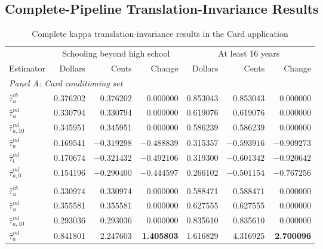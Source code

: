 \documentclass[12pt, a4paper, oneside]{article}
\theoremstyle{plain}
\theoremstyle{definition}
\begin{document}
\subsection{Complete-Pipeline Translation-Invariance Results}
\label{app:card_translation}


\begin{table}[H]
\centering
\caption{Complete kappa translation-invariance results in the Card application}
\label{tab:card_translation_kappa_appendix}
\footnotesize
\setlength{\tabcolsep}{4pt}
\begin{threeparttable}
\begin{tabular}{@{}lrrr rrr@{}}
\toprule
& \multicolumn{3}{c}{Schooling beyond high school}
& \multicolumn{3}{c}{At least 16 years} \\
\cmidrule(lr){2-4}\cmidrule(lr){5-7}
Estimator
& Dollars & Cents & Change
& Dollars & Cents & Change \\
\midrule
\multicolumn{7}{l}{\textit{Panel A: Card conditioning set}} \\[2pt]
$\hat{\tau}^{cb}_{u}$
& 0.376202 & 0.376202 & 0.000000
& 0.853043 & 0.853043 & 0.000000 \\
$\hat{\tau}^{ml}_{u}$
& 0.330794 & 0.330794 & 0.000000
& 0.619076 & 0.619076 & 0.000000 \\
$\hat{\tau}^{ml}_{a,10}$
& 0.345951 & 0.345951 & 0.000000
& 0.586239 & 0.586239 & 0.000000 \\
\addlinespace
$\hat{\tau}^{ml}_{a}$
& 0.169541 & $-0.319298$ & \textbf{$-0.488839$}
& 0.315357 & $-0.593916$ & \textbf{$-0.909273$} \\
$\hat{\tau}^{ml}_{t}$
& 0.170674 & $-0.321432$ & \textbf{$-0.492106$}
& 0.319300 & $-0.601342$ & \textbf{$-0.920642$} \\
$\hat{\tau}^{ml}_{a,0}$
& 0.154196 & $-0.290400$ & \textbf{$-0.444597$}
& 0.266102 & $-0.501154$ & \textbf{$-0.767256$} \\
\addlinespace[4pt]
\multicolumn{7}{l}{\textit{Panel B: Kitagawa conditioning set}} \\[2pt]
$\hat{\tau}^{cb}_{u}$
& 0.330974 & 0.330974 & 0.000000
& 0.588471 & 0.588471 & 0.000000 \\
$\hat{\tau}^{ml}_{u}$
& 0.355581 & 0.355581 & 0.000000
& 0.627555 & 0.627555 & 0.000000 \\
$\hat{\tau}^{ml}_{a,10}$
& 0.293036 & 0.293036 & 0.000000
& 0.835610 & 0.835610 & 0.000000 \\
\addlinespace
$\hat{\tau}^{ml}_{a}$
& 0.841801 & 2.247603 & \textbf{1.405803}
& 1.616829 & 4.316925 & \textbf{2.700096} \\

\end{tabular}
\end{threeparttable}
\end{table}
\end{document}
